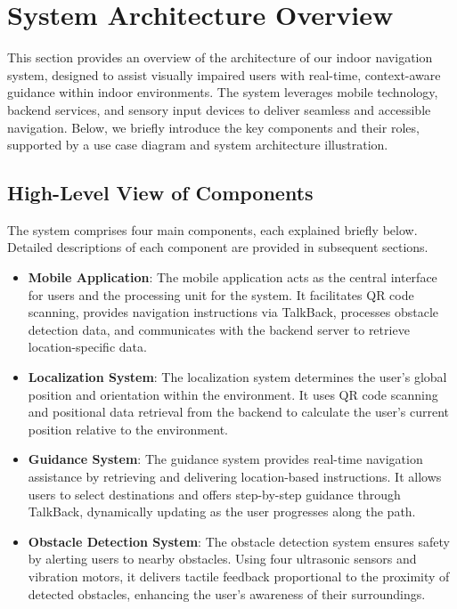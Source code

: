 \section{System Architecture Overview}

This section provides an overview of the architecture of our indoor navigation system, designed to assist visually impaired users with real-time, context-aware guidance within indoor environments. The system leverages mobile technology, backend services, and sensory input devices to deliver seamless and accessible navigation. Below, we briefly introduce the key components and their roles, supported by a use case diagram and system architecture illustration.

\subsection{High-Level View of Components}

The system comprises four main components, each explained briefly below. Detailed descriptions of each component are provided in subsequent sections.

\begin{itemize}
	\item \textbf{Mobile Application}: The mobile application acts as the central interface for users and the processing unit for the system. It facilitates QR code scanning, provides navigation instructions via TalkBack, processes obstacle detection data, and communicates with the backend server to retrieve location-specific data.
	
	\item \textbf{Localization System}: The localization system determines the user’s global position and orientation within the environment. It uses QR code scanning and positional data retrieval from the backend to calculate the user’s current position relative to the environment.
	
	\item \textbf{Guidance System}: The guidance system provides real-time navigation assistance by retrieving and delivering location-based instructions. It allows users to select destinations and offers step-by-step guidance through TalkBack, dynamically updating as the user progresses along the path.
	
	\item \textbf{Obstacle Detection System}: The obstacle detection system ensures safety by alerting users to nearby obstacles. Using four ultrasonic sensors and vibration motors, it delivers tactile feedback proportional to the proximity of detected obstacles, enhancing the user's awareness of their surroundings.
\end{itemize}

